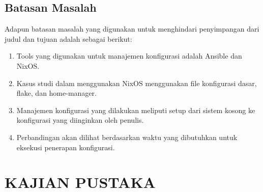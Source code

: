 \documentclass[10pt,]{report}
\begin{document}
\section{Batasan Masalah}
\vspace{-3mm}
\begin{adjustwidth}{0.70cm}{}
	Adapun batasan masalah yang digunakan untuk menghindari penyimpangan dari judul dan tujuan adalah sebagai berikut:
	\begin{enumerate}[leftmargin=0.45cm]
		\item Tools yang digunakan untuk manajemen konfigurasi adalah Ansible dan
		      NixOS.
		\item Kasus studi dalam menggunakan NixOS menggunakan file konfigurasi
		      dasar, flake, dan home-manager.
		\item Manajemen konfigurasi yang dilakukan meliputi setup dari sistem
		      kosong ke konfigurasi yang diinginkan oleh penulis.
		\item Perbandingan akan dilihat berdasarkan waktu yang dibutuhkan untuk
		      eksekusi penerapan konfigurasi.
	\end{enumerate}
\end{adjustwidth}
\chapter{KAJIAN PUSTAKA}
\end{document}

